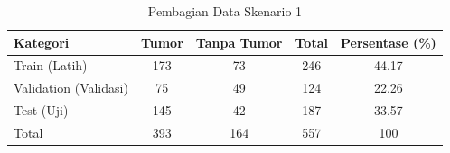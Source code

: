 \begin{table}[H]
	\centering
	\caption{Pembagian Data Skenario 1}
	\label{tab:dataset_test}
	\begin{tabular}{|l|c|c|c|c|}
		\hline
		\textbf{Kategori} & \textbf{Tumor} & \textbf{Tanpa Tumor} & \textbf{Total} & \textbf{Persentase (\%)} \\ \hline
		Train (Latih) & 173 & 73 & 246 & 44.17 \\ \hline
		Validation (Validasi) & 75 & 49 & 124 & 22.26 \\ \hline
		Test (Uji) & 145 & 42 & 187 & 33.57 \\ \hline
		Total & 393 & 164 & 557 & 100 \\ \hline
	\end{tabular}
\end{table}